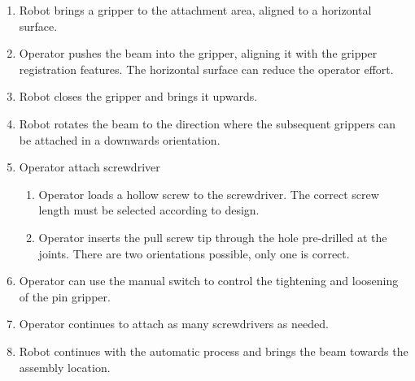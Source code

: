 \documentclass[11pt]{book}
\begin{document}
\begin{enumerate}
	\item Robot brings a gripper to the attachment area, aligned to a horizontal surface.

	\item Operator pushes the beam into the gripper, aligning it with the gripper registration features. The horizontal surface can reduce the operator effort.

	\item Robot closes the gripper and brings it upwards.

	\item Robot rotates the beam to the direction where the subsequent grippers can be attached in a downwards orientation.

	\item Operator attach screwdriver

\begin{enumerate}
	\item Operator loads a hollow screw to the screwdriver. The correct screw length must be selected according to design.

	\item Operator inserts the pull screw tip through the hole pre-drilled at the joints. There are two orientations possible, only one is correct.

\end{enumerate}
	\item Operator can use the manual switch to control the tightening and loosening of the pin gripper. 

	\item Operator continues to attach as many screwdrivers as needed.

	\item Robot continues with the automatic process and brings the beam towards the assembly location.

\end{enumerate}
\end{document}
